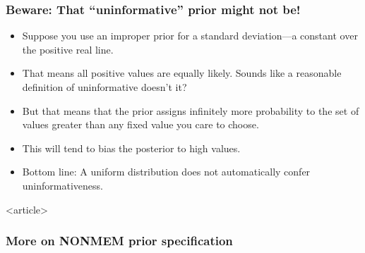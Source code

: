 \documentclass[handout]{beamer}
\begin{document}
\begin{frame}
\frametitle{Beware: That ``uninformative'' prior might not be!}

\begin{itemize}
\item Suppose you use an improper prior for a standard deviation---a
  constant over the positive real line.
\item That means all positive values are equally likely. Sounds like a
  reasonable definition of uninformative doesn't it?
\item But that means that the prior assigns infinitely more
  probability to the set of values greater than any fixed value you care to
  choose.
\item This will tend to bias the posterior to high values.
\item Bottom line: A uniform distribution does not automatically
  confer uninformativeness.
\end{itemize}

\end{frame}

\begin{frame}<article>
  \frametitle{More on NONMEM prior specification}
  


\end{frame}





\end{document}
